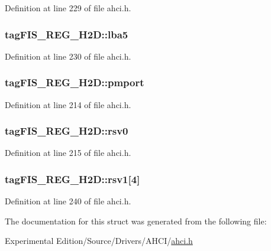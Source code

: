 Definition at line 229 of file ahci.\+h.

\subsubsection[{\texorpdfstring{lba5}{lba5}}]{ tag\+F\+I\+S\+\_\+\+R\+E\+G\+\_\+\+H2\+D\+::lba5}\hypertarget{structtagFIS__REG__H2D_aa8295bb116158a4e6505dfc97b180a3f}{}\label{structtagFIS__REG__H2D_aa8295bb116158a4e6505dfc97b180a3f}


Definition at line 230 of file ahci.\+h.

\subsubsection[{\texorpdfstring{pmport}{pmport}}]{ tag\+F\+I\+S\+\_\+\+R\+E\+G\+\_\+\+H2\+D\+::pmport}\hypertarget{structtagFIS__REG__H2D_aa3d53495bb86fbb278d0fa761cf3c1d2}{}\label{structtagFIS__REG__H2D_aa3d53495bb86fbb278d0fa761cf3c1d2}


Definition at line 214 of file ahci.\+h.

\subsubsection[{\texorpdfstring{rsv0}{rsv0}}]{ tag\+F\+I\+S\+\_\+\+R\+E\+G\+\_\+\+H2\+D\+::rsv0}\hypertarget{structtagFIS__REG__H2D_a2303b7cd4b3e3a74fc91f2eb40d461ef}{}\label{structtagFIS__REG__H2D_a2303b7cd4b3e3a74fc91f2eb40d461ef}


Definition at line 215 of file ahci.\+h.

\subsubsection[{\texorpdfstring{rsv1}{rsv1}}]{ tag\+F\+I\+S\+\_\+\+R\+E\+G\+\_\+\+H2\+D\+::rsv1\mbox{[}4\mbox{]}}\hypertarget{structtagFIS__REG__H2D_aeeff6159bfdf330d517a372b9c600e05}{}\label{structtagFIS__REG__H2D_aeeff6159bfdf330d517a372b9c600e05}


Definition at line 240 of file ahci.\+h.



The documentation for this struct was generated from the following file\+:\begin{DoxyCompactItemize}
\item 
Experimental Edition/\+Source/\+Drivers/\+A\+H\+C\+I/\hyperlink{ahci_8h}{ahci.\+h}\end{DoxyCompactItemize}
